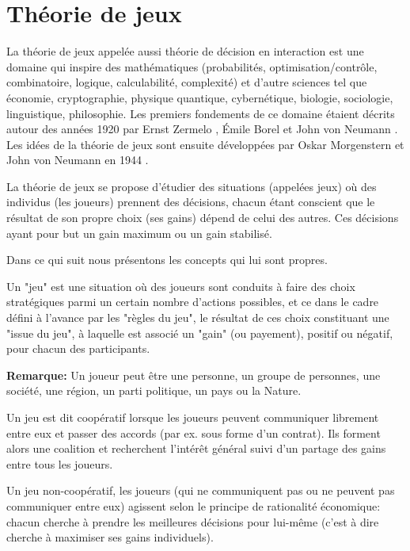 
\section{Théorie de jeux}

La théorie de jeux appelée aussi théorie de décision en interaction est une domaine qui inspire des mathématiques (probabilités, optimisation/contrôle, combinatoire, logique, calculabilité, complexité) et d’autre sciences tel que économie, cryptographie, physique quantique, cybernétique, biologie, sociologie, linguistique, philosophie.
Les premiers fondements de ce domaine étaient décrits autour des années 1920 par Ernst Zermelo \citep{depriester1913ernst}, Émile Borel \citep{EmileBorel1921} et John von Neumann \citep{depriester1928jonvon}. Les idées de la théorie de jeux sont ensuite développées par Oskar Morgenstern et John von Neumann en 1944 \citep{depriester1944jo}.

La théorie de jeux se propose d'étudier des situations (appelées jeux) où des individus (les joueurs) prennent des décisions, chacun étant conscient que le résultat de son propre choix (ses gains) dépend de celui des autres. Ces décisions ayant pour but un gain maximum ou un gain stabilisé.

Dans ce qui suit nous présentons les concepts qui lui sont propres.
\begin{definition}[Jeux]
Un "jeu" est une situation où des joueurs sont conduits à faire des choix stratégiques parmi un certain nombre d'actions possibles, et ce dans le cadre défini à l'avance par les "règles du jeu", le résultat de ces choix constituant une "issue du jeu", à laquelle est associé un "gain" (ou payement), positif ou négatif, pour chacun des participants.	
\end{definition}
\textbf{Remarque:} Un joueur peut être une personne, un groupe de personnes, une société, une région, un parti politique, un pays ou la Nature.

\begin{definition}
	Un jeu est dit coopératif lorsque les joueurs peuvent communiquer librement entre eux et passer des accords (par ex. sous forme d'un contrat). Ils forment alors une coalition et recherchent l'intérêt général suivi d'un partage des gains entre tous les joueurs.
\end{definition}
\begin{definition}
	Un jeu non-coopératif, les joueurs (qui ne communiquent pas ou ne peuvent pas communiquer entre eux) agissent selon le principe de rationalité économique: chacun cherche à prendre les meilleures décisions pour lui-même (c'est à dire cherche à maximiser ses gains individuels).
\end{definition}

